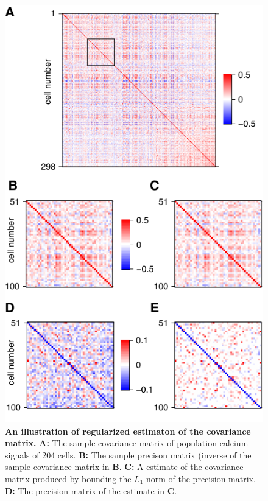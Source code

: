 \begin{figure}[htp]
\begin{center}
\includegraphics{figures/Example.pdf}
\end{center}
\caption{
{\bf An illustration of regularized estimaton of the covariance matrix.}  
{\bf A:} The sample covariance matrix of population calcium signals of 204 cells.
{\bf B:} The sample precison matrix (inverse of the sample covariance matrix in {\bf B}.
{\bf C:} A estimate of the covariance matrix produced by bounding the $L_1$ norm of the precision matrix. 
{\bf D:} The precision matrix of the estimate in {\bf C}.
}
\label{fig:00}
\end{figure}
